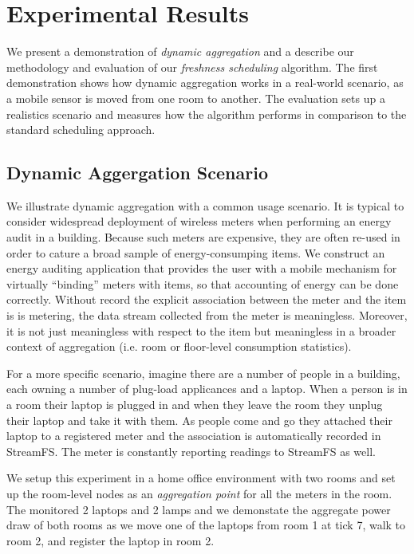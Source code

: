\section{Experimental Results}


We present a demonstration of \emph{dynamic aggregation} and a describe our methodology and evaluation of
our \emph{freshness scheduling} algorithm.  The first demonstration shows how dynamic aggregation works in a real-world
scenario, as a mobile sensor is moved from one room to another.  The evaluation sets up a realistics scenario and
measures how the algorithm performs in comparison to the standard scheduling approach.

\subsection{Dynamic Aggergation Scenario}
We illustrate dynamic aggregation with a common usage scenario.  It is typical to consider widespread deployment 
of wireless meters when performing an energy audit in a building.  Because such meters are expensive, they are often 
re-used in order to cature a broad sample of energy-consumping items.  We construct an energy auditing application
that provides the user with a mobile mechanism for virtually ``binding'' meters with items, so that accounting of
energy can be done correctly.  Without record the explicit association between the meter and the item is is metering, 
the data stream collected from the meter is meaningless.  Moreover, it is not just meaningless with respect to the item
but meaningless in a broader context of aggregation (i.e. room or floor-level consumption statistics).

For a more specific scenario, imagine there are a number of people in a building,
each owning a number of plug-load applicances and a laptop.  When a person is in a room their laptop
is plugged in and when they leave the room they unplug their laptop and take it with them.  As people come and go
they attached their laptop to a registered meter and the association is automatically recorded in StreamFS.
The meter is constantly reporting readings to StreamFS as well.  

We setup this experiment in a home office environment with two rooms
and set up the room-level nodes as an \emph{aggregation point} for all the meters in the room.  The monitored
2 laptops and 2 lamps and we demonstate the aggregate power draw of both rooms as we move one of the laptops from
room 1 at tick 7, walk to room 2, and register the laptop in room 2.

